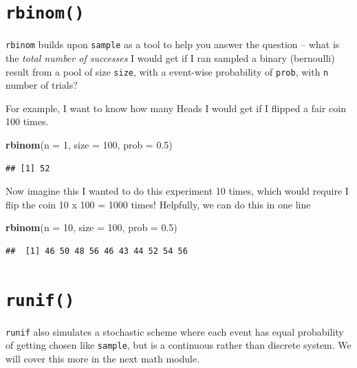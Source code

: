 \documentclass[]{book}
\newenvironment{Shaded}{\begin{snugshade}}{\end{snugshade}}
\newcommand{\KeywordTok}[1]{\textcolor[rgb]{0.13,0.29,0.53}{\textbf{#1}}}
\newcommand{\DataTypeTok}[1]{\textcolor[rgb]{0.13,0.29,0.53}{#1}}
\newcommand{\DecValTok}[1]{\textcolor[rgb]{0.00,0.00,0.81}{#1}}
\newcommand{\FloatTok}[1]{\textcolor[rgb]{0.00,0.00,0.81}{#1}}
\newcommand{\NormalTok}[1]{#1}
\theoremstyle{definition}
\theoremstyle{definition}
\theoremstyle{definition}
\theoremstyle{remark}
\begin{document}
\section{\texorpdfstring{\texttt{rbinom()}}{rbinom()}}\label{rbinom}

\texttt{rbinom} builds upon \texttt{sample} as a tool to help you answer
the question -- what is the \emph{total number of successes} I would get
if I ran sampled a binary (bernoulli) result from a pool of size
\texttt{size}, with a event-wise probability of \texttt{prob}, with
\texttt{n} number of trials?

For example, I want to know how many Heads I would get if I flipped a
fair coin 100 times.

\begin{Shaded}
\begin{Highlighting}[]
\KeywordTok{rbinom}\NormalTok{(}\DataTypeTok{n =} \DecValTok{1}\NormalTok{, }\DataTypeTok{size =} \DecValTok{100}\NormalTok{, }\DataTypeTok{prob =} \FloatTok{0.5}\NormalTok{)}
\end{Highlighting}
\end{Shaded}

\begin{verbatim}
## [1] 52
\end{verbatim}

Now imagine this I wanted to do this experiment 10 times, which would
require I flip the coin 10 x 100 = 1000 times! Helpfully, we can do this
in one line

\begin{Shaded}
\begin{Highlighting}[]
\KeywordTok{rbinom}\NormalTok{(}\DataTypeTok{n =} \DecValTok{10}\NormalTok{, }\DataTypeTok{size =} \DecValTok{100}\NormalTok{, }\DataTypeTok{prob =} \FloatTok{0.5}\NormalTok{)}
\end{Highlighting}
\end{Shaded}

\begin{verbatim}
##  [1] 46 50 48 56 46 43 44 52 54 56
\end{verbatim}

\section{\texorpdfstring{\texttt{runif()}}{runif()}}\label{runif}

\texttt{runif} also simulates a stochastic scheme where each event has
equal probability of getting chosen like \texttt{sample}, but is a
continuous rather than discrete system. We will cover this more in the
next math module.
\end{document}
